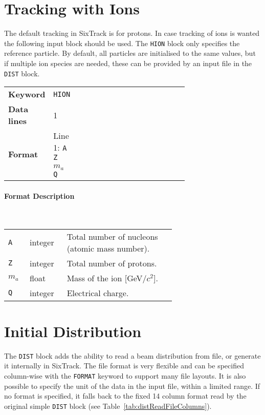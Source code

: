 \section{Tracking with Ions} \label{hions}

The default tracking in SixTrack is for protons.
In case tracking of ions is wanted the following input block should be used.
The \texttt{HION} block only specifies the reference particle.
By default, all particles are initialised to the same values, but if multiple ion species are needed, these can be provided by an input file in the \texttt{DIST} block.

\bigskip
\begin{tabular}{@{}llp{0.7\linewidth}}
    \textbf{Keyword}    & \texttt{HION}\index{HION} \\
    \textbf{Data lines} & 1 \\
    \textbf{Format}     & Line 1: \texttt{A Z $m_a$ Q}
\end{tabular}

\paragraph{Format Description}~

\bigskip
\begin{longtabu}{@{}llp{0.65\linewidth}}
    \texttt{A}     & integer & Total number of nucleons (atomic mass number). \\
    \texttt{Z}     & integer & Total number of protons. \\
    \texttt{$m_a$} & float   & Mass of the ion [GeV/$c^2$]. \\
    \texttt{Q}     & integer & Electrical charge.
\end{longtabu}

\section{Initial Distribution} \label{distBlock}

The \texttt{DIST} block adds the ability to read a beam distribution from file, or generate it internally in SixTrack.
The file format is very flexible and can be specified column-wise with the \texttt{FORMAT} keyword to support many file layouts.
It is also possible to specify the unit of the data in the input file, within a limited range.
If no format is specified, it falls back to the fixed 14 column format read by the original simple \texttt{DIST} block (see Table~\ref{tab:distReadFileColumns}).

